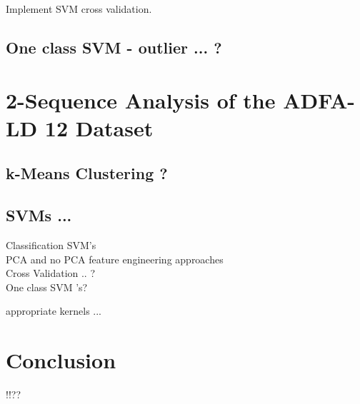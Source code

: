 \documentclass[reqno,openany,12pt]{amsbook}
\begin{document}
Implement SVM cross validation.

\section{ One class SVM - outlier  ... ?}



\chapter{2-Sequence Analysis of the ADFA-LD 12 Dataset}

\section{k-Means Clustering ?}

\section{SVMs ...}

Classification SVM's\\
PCA and no PCA feature engineering approaches\\
Cross Validation .. ?\\

One class SVM 's?

appropriate kernels ...

\chapter{Conclusion}


 !!?? 
 
 
 
\end{document}
